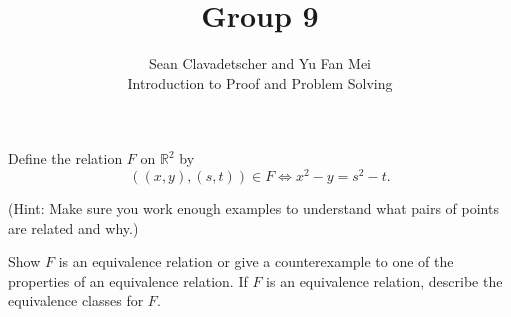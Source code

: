 \documentclass[12pt]{article}
\newenvironment{problem}[2][Problem]{\begin{trivlist}
\item[\hskip \labelsep {\bfseries #1}\hskip \labelsep {\bfseries #2.}]}{\end{trivlist}}
\begin{document}

\title{Group 9}%
\author{Sean Clavadetscher and Yu Fan Mei\\
	Introduction to Proof and Problem Solving} %

\maketitle

\begin{problem}{6}
    Define the relation \(F\) on \(\mathbb{R}^2\) by  
\[
((x, y), (s, t)) \in F \iff x^2 - y = s^2 - t.
\]

\noindent (Hint: Make sure you work enough examples to understand what pairs of points are related and why.) 

\noindent Show \(F\) is an equivalence relation or give a counterexample to one of the properties of an equivalence relation. If \(F\) is an equivalence relation, describe the equivalence classes for \(F\).
\end{problem}
\end{document}
